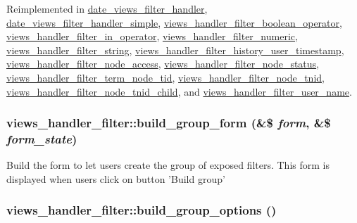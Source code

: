 Reimplemented in \hyperlink{classdate__views__filter__handler_a214c46a8a095cad6ac6159cbedbb4f35}{date\_\-views\_\-filter\_\-handler}, \hyperlink{classdate__views__filter__handler__simple_a0eb855c3f94765f6295868b81a27b9c3}{date\_\-views\_\-filter\_\-handler\_\-simple}, \hyperlink{classviews__handler__filter__boolean__operator_a7b58a9b58ae9778383b6a215834d7cdb}{views\_\-handler\_\-filter\_\-boolean\_\-operator}, \hyperlink{classviews__handler__filter__in__operator_a2c17bde9b5cb3498d31786ba888d545c}{views\_\-handler\_\-filter\_\-in\_\-operator}, \hyperlink{classviews__handler__filter__numeric_aaece85d3c36d4186c871cc55e636f4f2}{views\_\-handler\_\-filter\_\-numeric}, \hyperlink{classviews__handler__filter__string_a3152b0f2ce38cf493327e2a91b9c9f5e}{views\_\-handler\_\-filter\_\-string}, \hyperlink{classviews__handler__filter__history__user__timestamp_aa5eeead15fcc3d6e74ca62c31676e109}{views\_\-handler\_\-filter\_\-history\_\-user\_\-timestamp}, \hyperlink{classviews__handler__filter__node__access_a2f3abe4aa9418904e52937d1549fd560}{views\_\-handler\_\-filter\_\-node\_\-access}, \hyperlink{classviews__handler__filter__node__status_afad09e6f2c94d8f6748b48c3ce137a25}{views\_\-handler\_\-filter\_\-node\_\-status}, \hyperlink{classviews__handler__filter__term__node__tid_a392046588b13b1b76223eb22ba4ff660}{views\_\-handler\_\-filter\_\-term\_\-node\_\-tid}, \hyperlink{classviews__handler__filter__node__tnid_a037932cf19297e4b8544c24747509823}{views\_\-handler\_\-filter\_\-node\_\-tnid}, \hyperlink{classviews__handler__filter__node__tnid__child_a3762760577c3801276a683271be90e47}{views\_\-handler\_\-filter\_\-node\_\-tnid\_\-child}, and \hyperlink{classviews__handler__filter__user__name_aba7659d0d6c937d9c346e8ed3af532b6}{views\_\-handler\_\-filter\_\-user\_\-name}.\hypertarget{classviews__handler__filter_a80c87c1d0b08a8adbeda39b5daf0a5e2}{
\subsubsection[{build\_\-group\_\-form}]{\setlength{\rightskip}{0pt plus 5cm}views\_\-handler\_\-filter::build\_\-group\_\-form (\&\$ {\em form}, \/  \&\$ {\em form\_\-state})}}
\label{classviews__handler__filter_a80c87c1d0b08a8adbeda39b5daf0a5e2}
Build the form to let users create the group of exposed filters. This form is displayed when users click on button 'Build group' \hypertarget{classviews__handler__filter_a632cefd4a30b2fb929cdaeefd945eb98}{
\subsubsection[{build\_\-group\_\-options}]{\setlength{\rightskip}{0pt plus 5cm}views\_\-handler\_\-filter::build\_\-group\_\-options ()}}
